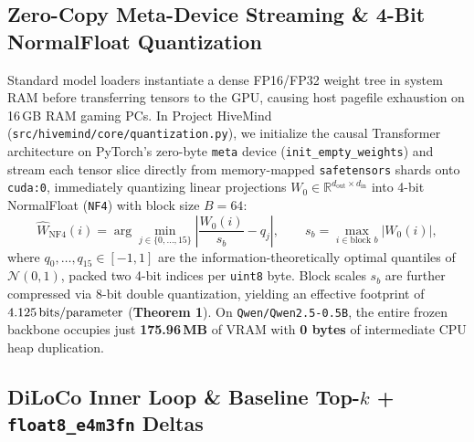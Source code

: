 \documentclass[11pt,a4paper]{article}
\begin{document}
\subsection{Zero-Copy Meta-Device Streaming \& 4-Bit NormalFloat Quantization}

Standard model loaders instantiate a dense FP16/FP32 weight tree in system RAM before transferring tensors to the GPU, causing host pagefile exhaustion on 16\,GB RAM gaming PCs. In Project HiveMind (\texttt{src/hivemind/core/quantization.py}), we initialize the causal Transformer architecture on PyTorch's zero-byte \texttt{meta} device (\texttt{init\_empty\_weights}) and stream each tensor slice directly from memory-mapped \texttt{safetensors} shards onto \texttt{cuda:0}, immediately quantizing linear projections $W_0 \in \mathbb{R}^{d_{\text{out}} \times d_{\text{in}}}$ into 4-bit NormalFloat (\texttt{NF4}) \cite{dettmers2023qlora} with block size $B = 64$:
\begin{equation}
    \hat{W}_{\text{NF4}}(i) = \arg\min_{j \in \{0,\dots,15\}} \left| \frac{W_0(i)}{s_b} - q_j \right|, \qquad s_b = \max_{i \in \text{block } b} |W_0(i)|,
\end{equation}
where $q_0, \dots, q_{15} \in [-1, 1]$ are the information-theoretically optimal quantiles of $\mathcal{N}(0, 1)$, packed two 4-bit indices per \texttt{uint8} byte. Block scales $s_b$ are further compressed via 8-bit double quantization, yielding an effective footprint of $4.125\text{\,bits/parameter}$ (\textbf{Theorem 1}). On \texttt{Qwen/Qwen2.5-0.5B}, the entire frozen backbone occupies just \textbf{175.96\,MB} of VRAM with \textbf{0 bytes} of intermediate CPU heap duplication.

\subsection{DiLoCo Inner Loop \& Baseline Top-$k$ + \texttt{float8\_e4m3fn} Deltas}
\end{document}
